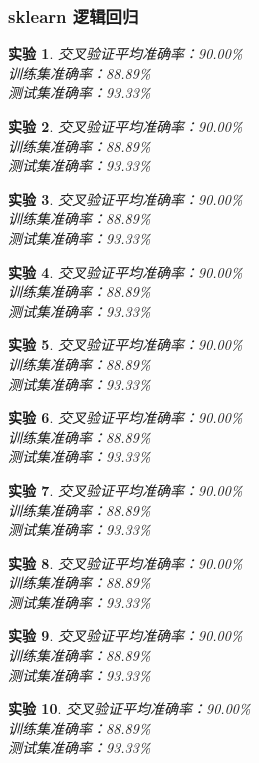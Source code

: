 \documentclass[cn,hazy,blue,14pt,normal]{elegantnote}
\newtheorem{train}{实验}
\begin{document}
\subsubsection{sklearn 逻辑回归}
\begin{train}交叉验证平均准确率：90.00\% \\  训练集准确率：88.89\% \\  测试集准确率：93.33\% \end{train}
\begin{train}交叉验证平均准确率：90.00\% \\  训练集准确率：88.89\% \\  测试集准确率：93.33\% \end{train}
\begin{train}交叉验证平均准确率：90.00\% \\  训练集准确率：88.89\% \\  测试集准确率：93.33\% \end{train}
\begin{train}交叉验证平均准确率：90.00\% \\  训练集准确率：88.89\% \\  测试集准确率：93.33\% \end{train}
\begin{train}交叉验证平均准确率：90.00\% \\  训练集准确率：88.89\% \\  测试集准确率：93.33\% \end{train}
\begin{train}交叉验证平均准确率：90.00\% \\  训练集准确率：88.89\% \\  测试集准确率：93.33\% \end{train}
\begin{train}交叉验证平均准确率：90.00\% \\  训练集准确率：88.89\% \\  测试集准确率：93.33\% \end{train}
\begin{train}交叉验证平均准确率：90.00\% \\  训练集准确率：88.89\% \\  测试集准确率：93.33\% \end{train}
\begin{train}交叉验证平均准确率：90.00\% \\  训练集准确率：88.89\% \\  测试集准确率：93.33\% \end{train}
\begin{train}交叉验证平均准确率：90.00\% \\  训练集准确率：88.89\% \\  测试集准确率：93.33\% \end{train}
\end{document}
